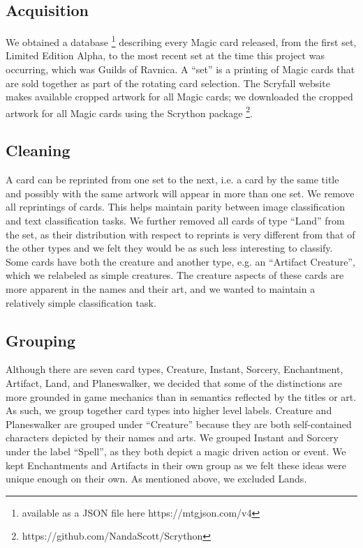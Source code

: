 \documentclass[letterpaper]{article} %
\begin{document}
\subsection{Acquisition}

We obtained a database
\footnote{available as a JSON file here https://mtgjson.com/v4}
describing every Magic card released,
from the first set,
Limited Edition Alpha,
to the most recent set at the time this project was occurring,
which was Guilds of Ravnica.
A ``set'' is a printing of Magic cards
that are sold together as part of the rotating card selection.
The Scryfall website makes available cropped artwork for all Magic cards;
we downloaded the cropped artwork for all Magic cards
using the Scrython package \footnote{https://github.com/NandaScott/Scrython}.

\subsection{Cleaning}

A card can be reprinted from one set to the next,
i.e. a card by the same title and possibly with the same artwork will appear
in more than one set.
We remove all reprintings of cards.
This helps maintain parity between image classification and text classification tasks.
We further removed all cards of type ``Land'' from the set,
as their distribution with respect to reprints
is very different from that of the other types
and we felt they would be as such less interesting to classify.
Some cards have both the creature and another type,
e.g. an ``Artifact Creature'',
which we relabeled as simple creatures.
The creature aspects of these cards are more apparent in the names and their art,
and we wanted to maintain a relatively simple classification task. 
 
\subsection{Grouping}

Although there are seven card types,
Creature, Instant, Sorcery, Enchantment, Artifact, Land, and Planeswalker,
we decided that some of the distinctions are more grounded in game mechanics
than in semantics reflected by the titles or art.
As such, we group together card types into higher level labels.
Creature and Planeswalker are grouped under  ``Creature''
because they are both self-contained characters depicted by their names and arts.
We grouped Instant and Sorcery under the label ``Spell'',
as they both depict a magic driven action or event.
We kept Enchantments and Artifacts in their own group
as we felt these ideas were unique enough on their own.
As mentioned above, we excluded Lands.
\end{document}
